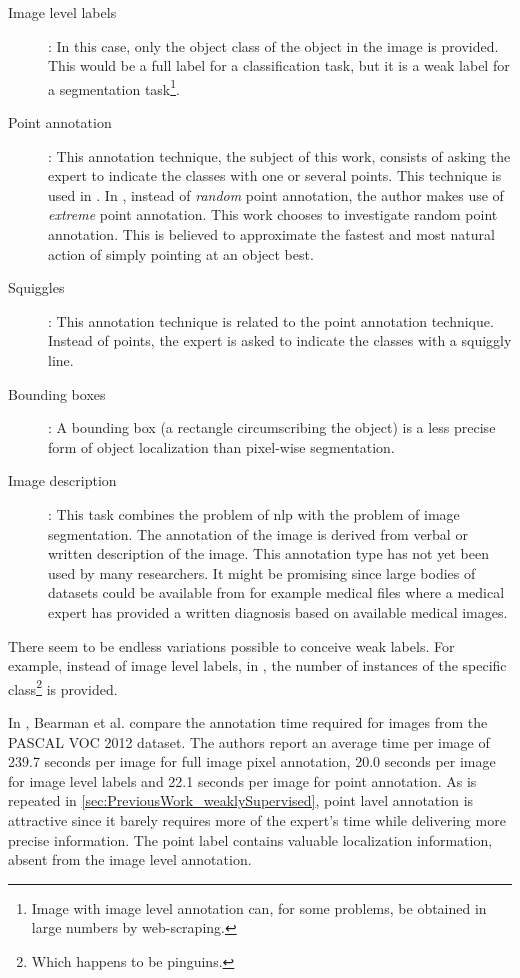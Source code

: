 \begin{description}
    \item[Image level labels]: In this case, only the object class of the object in the image is provided. 
    This would be a full label for a classification task, but it is a weak label for a segmentation task\footnote{Image with image level annotation can, for some problems, be obtained in large numbers by web-scraping.}.
    \item[Point annotation]: This annotation technique, the subject of this work, consists of asking the expert to indicate the classes with one or several points. This technique is used in \cite{Laradji2020, Laradji2018, McEver2020}.
    In \cite{Mainis}, instead of \textit{random} point annotation, the author makes use of \textit{extreme} point annotation. This work chooses to investigate random point annotation.
    This is believed to approximate the fastest and most natural action of simply pointing at an object best.
    \item[Squiggles]: This annotation technique is related to the point annotation technique. Instead of points, the expert is asked to indicate the classes with a squiggly line.
    \item[Bounding boxes]: A bounding box (a rectangle circumscribing the object) is a less precise form of object localization than pixel-wise segmentation.
    \item[Image description]: This task combines the problem of \acrlong{nlp} with the problem of image segmentation. The annotation of the image is derived from verbal or written description of the image. 
    This annotation type has not yet been used by many researchers. 
    It might be promising since large bodies of datasets could be available from for example medical files where a medical expert has provided a written diagnosis based on available medical images. 
\end{description}
\par{
    There seem to be endless variations possible to conceive weak labels. 
    For example, instead of image level labels, in \cite{Laradji2018}, the number of instances of the specific class\footnote{Which happens to be pinguins.} is provided. 
}
\par{
    In \cite{Bearman2015}, Bearman et al. compare the annotation time required for images from the PASCAL VOC 2012 dataset.
    The authors report an average time per image of 239.7 seconds per image for full image pixel annotation, 20.0 seconds per image for image level labels and 22.1 seconds per image for point annotation.
    As is repeated in \ref{sec:PreviousWork_weaklySupervised}, point lavel annotation is attractive since it barely requires more of the expert's time while delivering more precise information.
    The point label contains valuable localization information, absent from the image level annotation.
}
